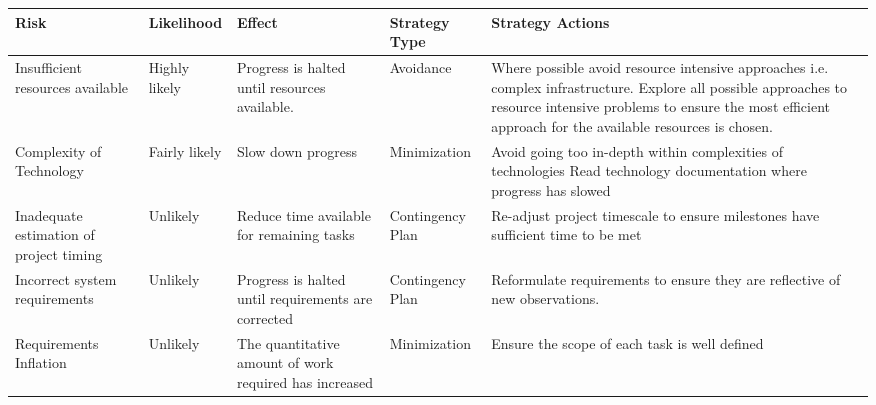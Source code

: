\documentclass[11pt]{report}
\begin{document}
\begin{landscape}
\begin{tabular}{ |>{\raggedright\arraybackslash}p{3cm}||p{3cm}|>{\raggedright\arraybackslash}p{5cm}|p{3cm}|>{\raggedright\arraybackslash}p{5cm}|  }
 \hline
 Risk & Likelihood & Effect & Strategy Type & Strategy Actions\\
  \hline
   Insufficient resources available & Highly likely & Progress is halted until resources available. & Avoidance & Where possible avoid resource intensive approaches i.e. complex infrastructure. \newline \newline Explore all possible approaches to resource intensive problems to ensure the most efficient approach for the available resources is chosen.\\
 \hline
 Complexity of Technology & Fairly likely & Slow down progress & Minimization & Avoid going too in-depth within complexities of technologies
 \newline \newline Read technology documentation where progress has slowed\\
  \hline
 Inadequate estimation of project timing & Unlikely & Reduce time available for remaining tasks & Contingency Plan & Re-adjust project timescale to ensure milestones have sufficient time to be met\\
  \hline
 Incorrect system requirements & Unlikely & Progress is halted until requirements are corrected & Contingency Plan & Reformulate requirements to ensure they are reflective of new observations. \\
 \hline
 Requirements Inflation & Unlikely & The quantitative amount of work required has increased & Minimization & Ensure the scope of each task is well defined \\
 \hline
\end{tabular}
\centering {}
\label{table:risk-analysis}
\end{landscape}
\restoregeometry %
\end{document}
